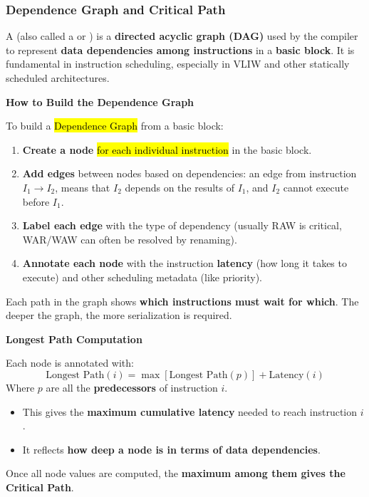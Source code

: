 \subsubsection{Dependence Graph and Critical Path}

A  (also called a  or ) is a \textbf{directed acyclic graph (DAG)} used by the compiler to represent \textbf{data dependencies among instructions} in a \textbf{basic block}. It is fundamental in instruction scheduling, especially in VLIW and other statically scheduled architectures.

\highspace
\begin{flushleft}
    \textcolor{Green3}{ \textbf{How to Build the Dependence Graph}}
\end{flushleft}
To build a \hl{Dependence Graph} from a basic block:
\begin{enumerate}
    \item \textbf{Create a node} \hl{for each individual instruction} in the basic block.
    \item \textbf{Add edges} between nodes based on dependencies: an edge from instruction $I_1 \rightarrow I_2$, means that $I_2$ depends on the results of $I_1$, and $I_2$ cannot execute before $I_1$.
    \item \textbf{Label each edge} with the type of dependency (usually RAW is critical, WAR/WAW can often be resolved by renaming).
    \item \textbf{Annotate each node} with the instruction \textbf{latency} (how long it takes to execute) and other scheduling metadata (like priority).
\end{enumerate}
Each path in the graph shows \textbf{which instructions must wait for which}. The deeper the graph, the more serialization is required.

\highspace
\begin{flushleft}
    \textcolor{Green3}{ \textbf{Longest Path Computation}}
\end{flushleft}
Each node is annotated with:
\begin{equation}
    \text{Longest Path}\left(i\right) = \max\left[\text{Longest Path}\left(p\right)\right] + \text{Latency}\left(i\right)    
\end{equation}
Where $p$ are all the \textbf{predecessors} of instruction $i$.
\begin{itemize}
    \item This gives the \textbf{maximum cumulative latency} needed to reach instruction $i$.
    \item It reflects \textbf{how deep a node is in terms of data dependencies}.
\end{itemize}
Once all node values are computed, the \textbf{maximum among them gives the Critical Path}.

